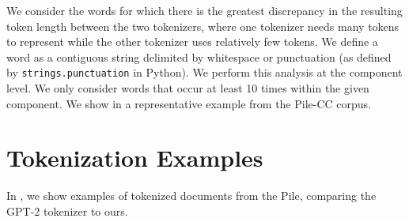 \documentclass[11pt]{article}
\begin{document}
We consider the words for which there is the greatest discrepancy in the resulting token length between the two tokenizers, where one tokenizer needs many tokens to represent while the other tokenizer uses relatively few tokens. We define a word as a contiguous string delimited by whitespace or punctuation (as defined by \texttt{strings.punctuation} in Python). We perform this analysis at the component level. We only consider words that occur at least 10 times within the given component. We show in  a representative example from the Pile-CC corpus.

\section{Tokenization Examples}\label{app:tokenization}

In , we show examples of tokenized documents from the Pile, comparing the GPT-2 tokenizer to ours.
\end{document}
